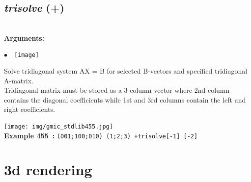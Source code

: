 \documentclass[a4paper,10.5pt,twoside]{book}
\def\comma{\discretionary{,}{}{,}}
\newcommand{\Cb}[1]{\textcolor{cb}{#1}}
\begin{document}
\subsection{\emph{trisolve} (+)}\vspace*{-0.7em}
~\\\textbf{\Cb{Arguments: }}\begin{flushleft}
{\small \Cb{\hspace*{0.5cm}$\bullet$~~\texttt{[image]}}}\end{flushleft}
Solve tridiagonal system AX = B for selected B-vectors and specified tridiagonal A-matrix.
~\\Tridiagonal matrix must be stored as a 3 column vector{\comma} where 2nd column contains the
diagonal coefficients{\comma} while 1st and 3rd columns contain the left and right coefficients.
\begin{center}\texttt{[image: img/gmic\_stdlib455.jpg]}\\
{\footnotesize \textbf{Example 455~:} \texttt{(0{\comma}0{\comma}1;1{\comma}0{\comma}0;0{\comma}1{\comma}0) (1;2;3) +trisolve[-1] [-2]}}
\end{center}
\section{3d rendering}
\end{document}
